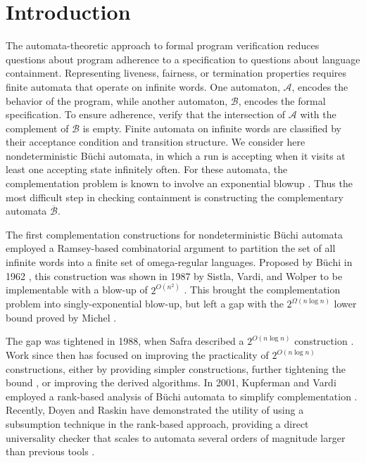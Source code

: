 \documentclass{LMCS}
\newcommand\buchi{B\"uchi }
\newcommand{\A}{{\mathcal A}}
\newcommand{\B}{{\mathcal B}}
\begin{document}
\section{Introduction}\label{Sect:Introduction}
The automata-theoretic approach to formal program verification reduces questions
about program adherence to a specification to questions about language
containment. Representing liveness, fairness, or termination properties requires
finite automata that operate on infinite words.  One automaton, $\A$, encodes
the behavior of the program, while another automaton, $\B$, encodes the formal
specification.  To ensure adherence, verify that the intersection of $\A$ with
the complement of $\B$ is empty.  Finite automata on infinite words are
classified by their acceptance condition and transition structure. We consider
here nondeterministic \buchi automata, in which a run is accepting when it
visits at least one accepting state infinitely often. For these automata, the
complementation problem is known to involve an exponential blowup \cite{Mic88}.  Thus the most
difficult step in checking containment is constructing the complementary
automata $\overline{\B}$.  

The first complementation constructions for nondeterministic \buchi automata
employed a Ramsey-based combinatorial argument to partition the set of
all infinite words into a finite set of omega-regular languages. Proposed by \buchi in
1962 \cite{Buc62}, this construction was shown in 1987 by Sistla, Vardi, and
Wolper to be implementable with a blow-up of $2^{O(n^2)}$ \cite{SVW85}. This
brought the complementation problem into singly-exponential blow-up, but left a
gap with the $2^{\Omega(n\log n)}$ lower bound proved by Michel \cite{Mic88}.

The gap was tightened in 1988, when Safra described a $2^{O(n\log n)}$
construction \cite{Saf88}. Work since then has focused on improving the
practicality of $2^{O(n\log n)}$ constructions, either by providing simpler
constructions, further tightening the bound \cite{Sch09}, or improving the derived
algorithms. In 2001, Kupferman and Vardi employed a rank-based analysis of \buchi
automata to simplify complementation \cite{KV01c}.  Recently, Doyen and Raskin
have demonstrated the utility of using a subsumption technique in the
rank-based approach, providing a direct universality checker that scales to
automata several orders of magnitude larger than previous tools \cite{DR09}. 
\end{document}
